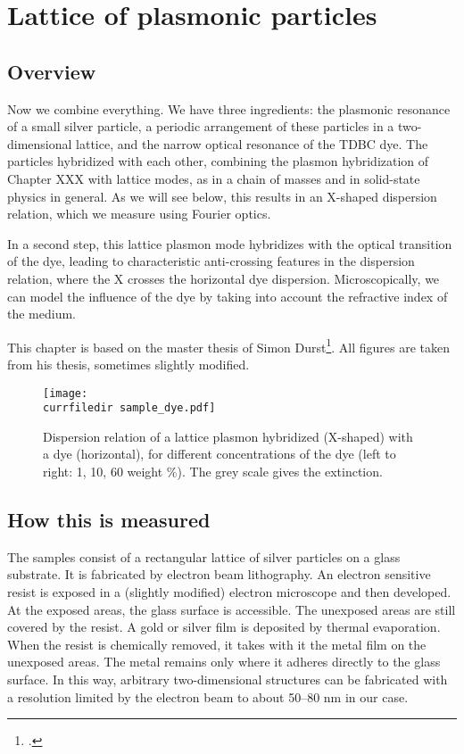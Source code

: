 \renewcommand{\lastmod}{December 1, 2023}
\renewcommand{\chapterauthors}{Markus Lippitz}


\chapter{Lattice of plasmonic particles}

\section{Overview}

Now we combine everything. We have three ingredients: the plasmonic resonance of a small silver particle, a periodic arrangement of these particles in a two-dimensional lattice, and the narrow optical resonance of the TDBC dye. The particles hybridized with each other, combining the plasmon hybridization of Chapter XXX with lattice modes, as in a chain of masses and in solid-state physics in general. As we will see below, this results in an X-shaped dispersion relation, which we measure using Fourier optics.

In a second step, this lattice plasmon mode hybridizes with the optical transition of the dye, leading to characteristic anti-crossing features in the dispersion relation, where the X crosses the horizontal dye dispersion. Microscopically, we can model the influence of the dye by taking into account the refractive index of the medium.

This chapter is based on the master thesis of Simon Durst\footcite{Durst21}. All figures are taken from his thesis, sometimes slightly modified.


\begin{figure}
  \texttt{[image: \\currfiledir sample\_dye.pdf]}
  \caption{Dispersion relation of a lattice plasmon hybridized (X-shaped) with a dye (horizontal), for different concentrations of the dye (left to right: 1, 10, 60 weight \%). The grey scale gives the extinction. \label{fig:8_intro} }
  \end{figure}
  

  

\section{How this is  measured}

The samples consist of a rectangular lattice of silver particles on a glass substrate. It is fabricated by electron beam lithography. An electron sensitive resist is exposed in a (slightly modified) electron microscope and then developed. At the exposed areas, the glass surface is accessible. The unexposed areas are still covered by the resist.  A gold or silver film is deposited by thermal evaporation. When the resist is chemically removed, it takes with it the metal film on the unexposed areas. The metal remains only where it adheres directly to the glass surface. In this way, arbitrary two-dimensional structures can be fabricated with a resolution limited by the electron beam to about 50--80 nm in our case.

